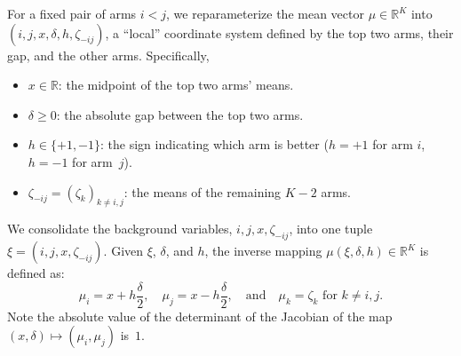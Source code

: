 \documentclass[10pt]{article}
\theoremstyle{plain}
\begin{document}
\begin{definition}
For a fixed pair of arms $i < j$, we reparameterize the mean vector $\mu \in \mathbb{R}^K$ into $(i,j,x,\delta,h,\zeta_{-ij})$, a ``local'' coordinate system defined by the top two arms, their gap, and the other arms. Specifically,
\begin{itemize}
    \item $x \in \mathbb{R}$: the midpoint of the top two arms' means.
    \item $\delta \ge 0$: the absolute gap between the top two arms.
    \item $h \in \{+1, -1\}$: the sign indicating which arm is   better ($h=+1$ for arm $i$, $h=-1$ for arm~$j$).
    \item $\zeta_{-ij} = (\zeta_k)_{k \neq i,j}$: the means of the remaining $K-2$ arms.
\end{itemize}
We consolidate the background variables, $i, j, x, \zeta_{-ij}$, into one tuple $\xi = (i, j, x, \zeta_{-ij})$. Given $\xi$, $\delta$, and $h$, the inverse mapping $\mu(\xi, \delta, h) \in \mathbb{R}^K$ is defined as: %
\begin{equation}
     \mu_i = x + h\frac{\delta}{2}, \quad \mu_j = x - h\frac{\delta}{2}, \quad \mbox{and}\quad\mu_k = \zeta_k \text{ for } k \neq i,j.\label{eqn:local_coord}
\end{equation}
Note the absolute value of the determinant of the Jacobian of the map $(x, \delta) \mapsto (\mu_i, \mu_j)$ is~$1$.
\end{definition}



\end{document}
